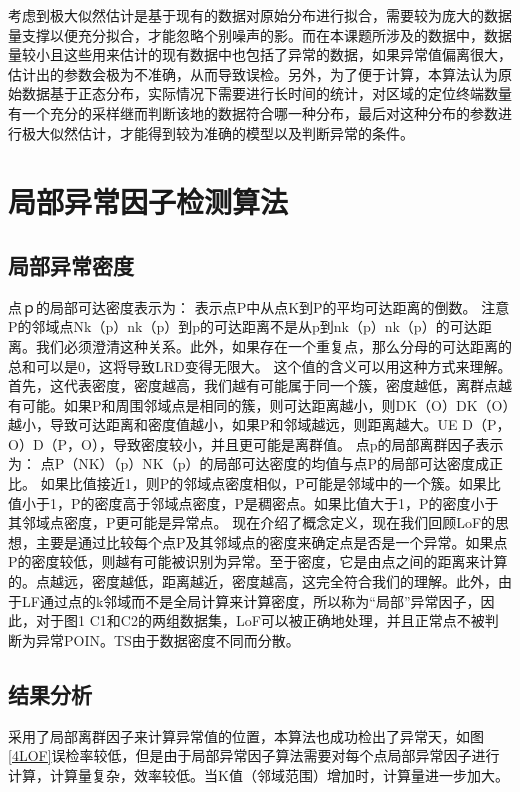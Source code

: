 \documentclass[a4paper,AutoFakeBold,oneside,12pt]{book}
\begin{document}
{{	考虑到极大似然估计是基于现有的数据对原始分布进行拟合，需要较为庞大的数据量支撑以便充分拟合，才能忽略个别噪声的影。而在本课题所涉及的数据中，数据量较小且这些用来估计的现有数据中也包括了异常的数据，如果异常值偏离很大，估计出的参数会极为不准确，从而导致误检。另外，为了便于计算，本算法认为原始数据基于正态分布，实际情况下需要进行长时间的统计，对区域的定位终端数量有一个充分的采样继而判断该地的数据符合哪一种分布，最后对这种分布的参数进行极大似然估计，才能得到较为准确的模型以及判断异常的条件。

\section{局部异常因子检测算法}
\subsection{局部异常密度}
点ｐ的局部可达密度表示为：
	表示点P中从点K到P的平均可达距离的倒数。
	注意P的邻域点Nk（p）nk（p）到p的可达距离不是从p到nk（p）nk（p）的可达距离。我们必须澄清这种关系。此外，如果存在一个重复点，那么分母的可达距离的总和可以是0，这将导致LRD变得无限大。
	这个值的含义可以用这种方式来理解。首先，这代表密度，密度越高，我们越有可能属于同一个簇，密度越低，离群点越有可能。如果P和周围邻域点是相同的簇，则可达距离越小，则DK（O）DK（O）越小，导致可达距离和密度值越小，如果P和邻域越远，则距离越大。UE D（P，O）D（P，O），导致密度较小，并且更可能是离群值。
	点p的局部离群因子表示为：
	点P（NK）（p）NK（p）的局部可达密度的均值与点P的局部可达密度成正比。
	如果比值接近1，则P的邻域点密度相似，P可能是邻域中的一个簇。如果比值小于1，P的密度高于邻域点密度，P是稠密点。如果比值大于1，P的密度小于其邻域点密度，P更可能是异常点。
	现在介绍了概念定义，现在我们回顾LoF的思想，主要是通过比较每个点P及其邻域点的密度来确定点是否是一个异常。如果点P的密度较低，则越有可能被识别为异常。至于密度，它是由点之间的距离来计算的。点越远，密度越低，距离越近，密度越高，这完全符合我们的理解。此外，由于LF通过点的k邻域而不是全局计算来计算密度，所以称为“局部”异常因子，因此，对于图1 C1和C2的两组数据集，LoF可以被正确地处理，并且正常点不被判断为异常POIN。TS由于数据密度不同而分散。

\subsection{结果分析}
采用了局部离群因子来计算异常值的位置，本算法也成功检出了异常天，如图\ref{4LOF}误检率较低，但是由于局部异常因子算法需要对每个点局部异常因子进行计算，计算量复杂，效率较低。当K值（邻域范围）增加时，计算量进一步加大。

}}
\end{document}
